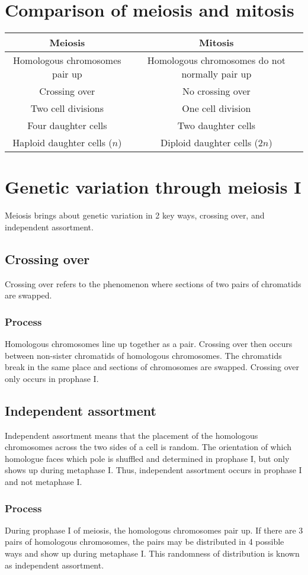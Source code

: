 \documentclass[11pt]{article}
\begin{document}
\section{Comparison of meiosis and mitosis}
\label{sec:org0deab87}
\begin{center}
\begin{tabular}{c|c}
\textbf{Meiosis} & \textbf{Mitosis} \\
\hline
Homologous chromosomes pair up & Homologous chromosomes do not normally pair up \\
Crossing over & No crossing over \\
Two cell divisions & One cell division \\
Four daughter cells & Two daughter cells \\
Haploid daughter cells ($n$) & Diploid daughter cells ($2n$)
\end{tabular}
\end{center}
\section{Genetic variation through meiosis I}
\label{sec:org26781bb}
Meiosis brings about genetic variation in 2 key ways, crossing over, and independent assortment.
\subsection{Crossing over}
\label{sec:orga559113}
Crossing over refers to the phenomenon where sections of two pairs of chromatids are swapped.
\subsubsection{Process}
\label{sec:org3f7ed55}
Homologous chromosomes line up together as a pair. Crossing over then occurs between non-sister chromatids of homologous chromosomes. The chromatids break in the same place and sections of chromosomes are swapped. Crossing over only occurs in prophase I.
\subsection{Independent assortment}
\label{sec:org0817032}
Independent assortment means that the placement of the homologous chromosomes across the two sides of a cell is random. The orientation of which homologue faces which pole is shuffled and determined in prophase I, but only shows up during metaphase I. Thus, independent assortment occurs in prophase I and not metaphase I.
\subsubsection{Process}
\label{sec:org1dfd1fe}
During prophase I of meiosis, the homologous chromosomes pair up. If there are 3 pairs of homologous chromosomes, the pairs may be distributed in 4 possible ways and show up during metaphase I. This randomness of distribution is known as independent assortment.
\end{document}
